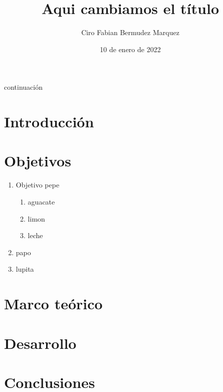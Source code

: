 \documentclass[10pt,a4paper]{article}							%
\author{Ciro Fabian Bermudez Marquez}
\title{Aqui cambiamos el título}
\date{10 de enero de 2022}
\begin{document}
\maketitle

continuación

\section{Introducción}
\lipsum[1-3]

\section{Objetivos}

\begin{enumerate}
	\item Objetivo pepe
		\begin{enumerate}
			\item aguacate
			\item limon
			\item leche
		\end{enumerate}
	\item papo
	\item lupita
\end{enumerate}

\section{Marco teórico}

\section{Desarrollo}

\section{Conclusiones}
\end{document}
